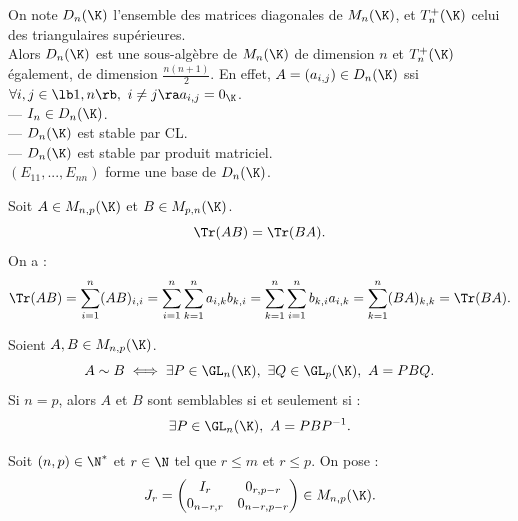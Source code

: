 \documentclass[11pt]{article}
\begin{document}
\begin{prop}{}{}
    On note $D_n(\K)$ l'ensemble des matrices diagonales de $M_n(\K)$, et $T_n^+(\K)$ celui des triangulaires supérieures.\\
    Alors $D_n(\K)$ est une sous-algèbre de $M_n(\K)$ de dimension $n$ et $T_n^+(\K)$ également, de dimension $\frac{n(n+1)}{2}$.
    \tcblower
    En effet, $A=(a_{i,j})\in D_n(\K)$ ssi $\forall i,j\in\lb1,n\rb, ~ i\neq j \ra a_{i,j}=0_{\K}$.\\
    --- $I_n\in D_n(\K)$.\\
    --- $D_n(\K)$ est stable par CL.\\
    --- $D_n(\K)$ est stable par produit matriciel.\\
    $(E_{11},...,E_{nn})$ forme une base de $D_n(\K)$.
\end{prop}

\vspace*{-0.7cm}

\begin{prop}{}{}
    Soit $A\in M_{n,p}(\K)$ et $B\in M_{p,n}(\K)$.
    \begin{equation*}
        \Tr(AB)=\Tr(BA).
    \end{equation*}
    \tcblower
    On a :
    \begin{equation*}
        \Tr(AB)=\sum_{i=1}^n(AB)_{i,i}=\sum_{i=1}^n\sum_{k=1}^na_{i,k}b_{k,i}=\sum_{k=1}^n\sum_{i=1}^nb_{k,i}a_{i,k}=\sum_{k=1}^n(BA)_{k,k}=\Tr(BA).
    \end{equation*}
\end{prop}

\begin{defi}{}{}
    Soient $A,B\in M_{n,p}(\K)$.
    \begin{equation*}
        A \sim B \iff \exists P \in \GL_n(\K), ~ \exists Q \in \GL_p(\K), ~ A = PBQ.
    \end{equation*}
    Si $n=p$, alors $A$ et $B$ sont semblables si et seulement si :
    \begin{equation*}
        \exists P \in \GL_n(\K), ~ A = PBP^{-1}.
    \end{equation*}
\end{defi}

\vspace*{-0.7cm}

\begin{defi}{}{}
    Soit $(n,p)\in\N^*$ et $r\in\N$ tel que $r\leq m$ et $r\leq p$. On pose :
    \begin{equation*}
        J_r = \begin{pmatrix}
            I_r & 0_{r,p-r}\\
            0_{n-r,r} & 0_{n-r,p-r}
        \end{pmatrix} \in M_{n,p}(\K).
    \end{equation*}
\end{defi}
\end{document}
